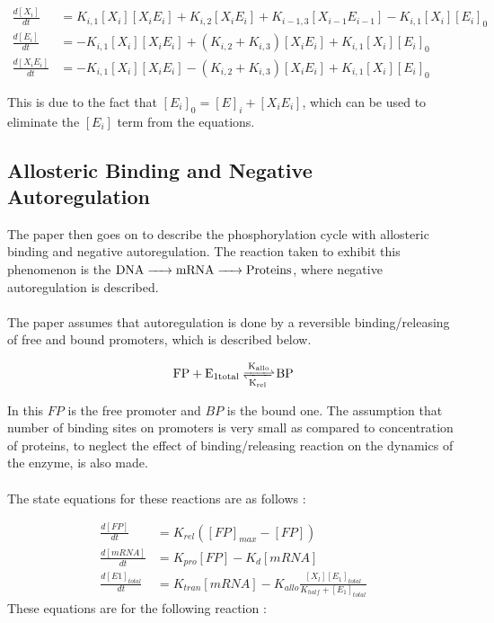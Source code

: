 \begin{align*}
    \frac{d[X_i]}{dt} &= K_{i,1}[X_i][X_iE_i] + K_{i,2}[X_iE_i] + K_{i-1,3}[X_{i-1}E_{i-1}] - K_{i,1}[X_i][E_i]_0\\
    \frac{d[E_i]}{dt} &= -K_{i,1}[X_i][X_iE_i] + (K_{i,2} + K_{i,3})[X_iE_i] + K_{i,1}[X_i][E_i]_0 \\
    \frac{d[X_iE_i]}{dt} &= -K_{i,1}[X_i][X_iE_i] - (K_{i,2} + K_{i,3})[X_iE_i] + K_{i,1}[X_i][E_i]_0
\end{align*}

\noindent This is due to the fact that $[E_i]_0 = [E]_i + 
[X_iE_i]$, which can be used to eliminate the $[E_i]$ term 
from the equations. 

\subsection*{Allosteric Binding and Negative Autoregulation}
The paper then goes on to describe the phosphorylation 
cycle with allosteric binding and negative autoregulation. 
The reaction taken to exhibit this phenomenon is the
$\ce{DNA -> mRNA -> Proteins}$, where negative 
autoregulation is described.
\\\\
The paper assumes that autoregulation is done by a reversible 
binding/releasing of free and bound promoters, which is 
described below.

$$ \ce{FP + E_{1total} <=>[K_{allo}][K_{rel}] BP} $$

\noindent In this $FP$ is the free promoter and $BP$ is the 
bound one. The assumption that number of binding sites on 
promoters is very small as compared to concentration of 
proteins, to neglect the effect of binding/releasing 
reaction on the dynamics of the enzyme, is also made.
\\\\
The state equations for these reactions are as follows :

\begin{align*}
    \frac{d[FP]}{dt} &= K_{rel}([FP]_{max} - [FP])\\
    \frac{d[mRNA]}{dt} &= K_{pro}[FP] - K_d[mRNA]\\
    \frac{d[E1]_{total}}{dt} &= K_{tran}[mRNA] - K_{allo}\frac{[X_l][E_1]_{total}}{K_{half} + [E_1]_{total}}
\end{align*}
\newpage
\noindent These equations are for the following reaction :

